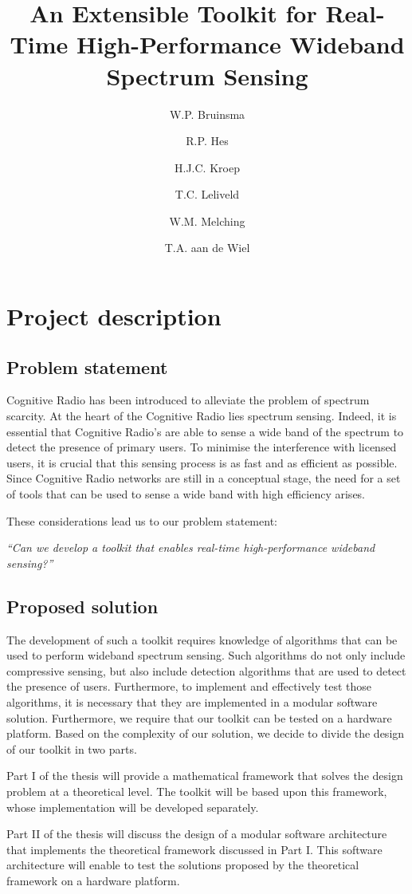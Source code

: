 \documentclass[a4paper, openany, oneside]{memoir}
\title{An Extensible Toolkit for Real-Time High-Performance Wideband Spectrum Sensing}
\author{W.P. Bruinsma \and R.P. Hes \and H.J.C. Kroep \and T.C. Leliveld \and W.M. Melching \and T.A. aan de Wiel}
\begin{document}
\chapter{Project description} \label{cha:problem_statement}
\section{Problem statement}

Cognitive Radio has been introduced to alleviate the problem of spectrum scarcity.
At the heart of the Cognitive Radio lies spectrum sensing. Indeed, it is essential that Cognitive Radio's are able to sense a wide band of the spectrum to detect the presence of primary users. To minimise the interference with licensed users, it is crucial that this sensing process is as fast and as efficient as possible. Since Cognitive Radio networks are still in a conceptual stage, the need for a set of tools that can be used to sense a wide band with high efficiency arises.

These considerations lead us to our problem statement:
\begin{center}
\emph{``Can we develop a toolkit that enables real-time high-performance wideband sensing?''}
\end{center}

\section{Proposed solution}
The development of such a toolkit requires knowledge of algorithms that can be used to perform wideband spectrum sensing. Such algorithms do not only include compressive sensing, but also include detection algorithms that are used to detect the presence of users. Furthermore, to implement and effectively test those algorithms, it is necessary that they are implemented in a modular software solution. Furthermore, we require that our toolkit can be tested on a hardware platform. Based on the complexity of our solution, we decide to divide the design of our toolkit in two parts.

Part I of the thesis will provide a mathematical framework that solves the design problem at a theoretical level. The toolkit will be based upon this framework, whose implementation will be developed separately.

Part II of the thesis will discuss the design of a modular software architecture that  implements the theoretical framework discussed in Part I. This software architecture will enable to test the solutions proposed by the theoretical framework on a hardware platform.
\end{document}
